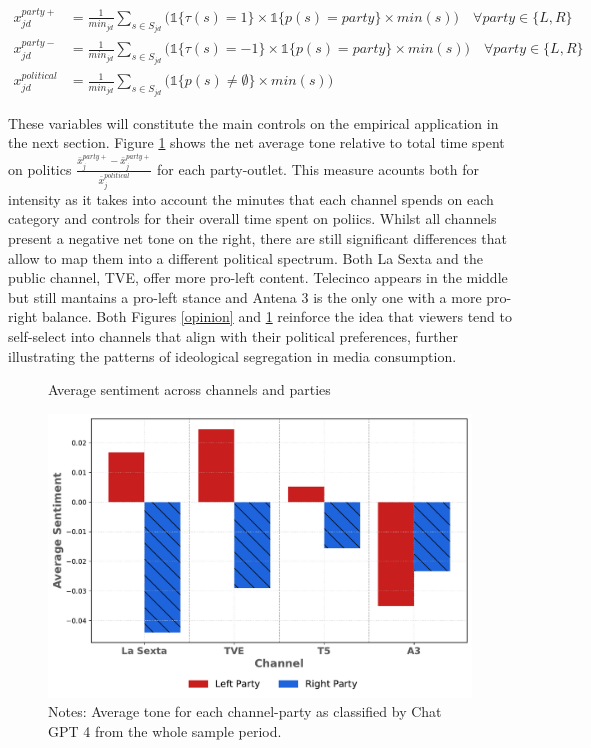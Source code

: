 \documentclass[12pt]{article}
\begin{document}
	

		\begin{equation}\label{eq:controls}
		\begin{aligned}
			x_{jd}^{party+}&= \frac{1}{min_{jd}} \sum_{s \in S_{jd}}\bigg(\mathds{1}\{\tau(s)=1\} \times \mathds{1}\{p(s)=party\}\times min(s) \bigg) \quad \forall party \in \{L,R\} \\
			x_{jd}^{party-}&= \frac{1}{min_{jd}} \sum_{s \in S_{jd}}\bigg( \mathds{1}\{\tau(s)=-1\} \times \mathds{1}\{p(s)=party\} \times min(s)\bigg) \quad \forall party \in \{L,R\} \\
			x_{jd}^{political}&=\frac{1}{min_{jd}} \sum_{s \in S_{jd}}\bigg(  \mathds{1}\{p(s)\neq\emptyset\}\times min(s) \bigg)
		\end{aligned}
	\end{equation} 
	
	These variables will constitute the main controls on the empirical application in the next section.  Figure \ref{fig:chat} shows the net average tone relative to total time spent on politics $ \frac{\bar{x}_j^{party+}  - \bar{x}_j^{party+} }{\bar{x}_j^{political}}$ for each party-outlet. This measure acounts both for intensity as it takes into account the minutes that each channel spends on each category and controls for their overall time spent on poliics. Whilst all channels present a negative net tone on the right, there are still significant differences that allow to map them into a different political spectrum. Both La Sexta and the public channel, TVE, offer more pro-left content. Telecinco appears in the middle but still mantains a pro-left stance and Antena 3 is the only one with a more pro-right balance. 	 Both Figures \ref{opinion} and \ref{fig:chat} reinforce the idea that viewers tend to self-select into channels that align with their political preferences, further illustrating the patterns of ideological segregation in media consumption.
	
	
	
	
	
	\begin{figure}[h!]
		\caption{Average sentiment across channels and parties}
		\centering
		\includegraphics[width=120mm]{figures/chatgpt}
		\caption*{\small Notes: Average tone for each channel-party as classified by Chat GPT 4 from the whole sample period. }
		\label{fig:chat}
	\end{figure}
	
\end{document}
